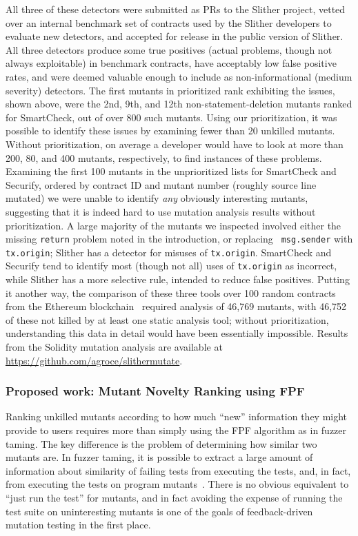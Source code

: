 All three of these detectors were submitted as PRs to the Slither
project, vetted over an internal benchmark set of contracts used by
the Slither developers to evaluate new detectors, and accepted for
release in the public version of Slither.  All three detectors produce
some true positives (actual problems, though not always exploitable)
in benchmark contracts, have acceptably low false positive rates, and
were deemed valuable enough to include as non-informational (medium
severity) detectors.  The first mutants in prioritized rank exhibiting
the issues, shown above, were the 2nd, 9th, and 12th
non-statement-deletion mutants ranked for SmartCheck, out of over 800
such mutants.  Using our prioritization, it was possible to identify
these issues by examining fewer than 20 unkilled mutants.  Without
prioritization, on average a developer would have to look at more than
200, 80, and 400 mutants, respectively, to find instances of these
problems.  Examining the first 100 mutants in the unprioritized lists for SmartCheck and Securify, ordered by contract ID and mutant number (roughly source line mutated) we were unable to identify \emph{any} obviously interesting mutants, suggesting that it is indeed hard to use mutation analysis results without prioritization. A large majority of the mutants we inspected involved either the missing
{\tt return} problem noted in the introduction, or replacing {\tt
  msg.sender} with {\tt tx.origin}; Slither has a detector for misuses
of {\tt tx.origin}.  SmartCheck and Securify tend to identify most
(though not all) uses of {\tt tx.origin} as incorrect, while Slither
has a more selective rule, intended to reduce false positives.
Putting it another way, the comparison of these three tools over 100 random contracts
from the Ethereum blockchain~\cite{buterin2013whitepaper,wood2014yellow} required analysis of 46,769 mutants, with
46,752 of these not killed by at least one static analysis tool;
without prioritization, understanding this data in detail would have
been essentially impossible.  Results from the
Solidity mutation analysis are available at
\url{https://github.com/agroce/slithermutate}.


\subsubsection{Proposed work: Mutant Novelty Ranking using FPF}

Ranking unkilled mutants according to how much ``new'' information they might
provide to users requires more than simply using the FPF algorithm as
in fuzzer taming.  The key difference is the problem of determining
how similar two mutants are.  In fuzzer taming, it is possible to
extract a large amount of information about similarity of failing
tests from executing the tests, and, in fact, from executing the tests
on program mutants~\cite{PLDI13,distMut}.  There is no obvious
equivalent to
``just run the test'' for mutants, and in fact avoiding the expense of running
the test suite on uninteresting mutants is one of the goals of
feedback-driven mutation testing in the first place.

